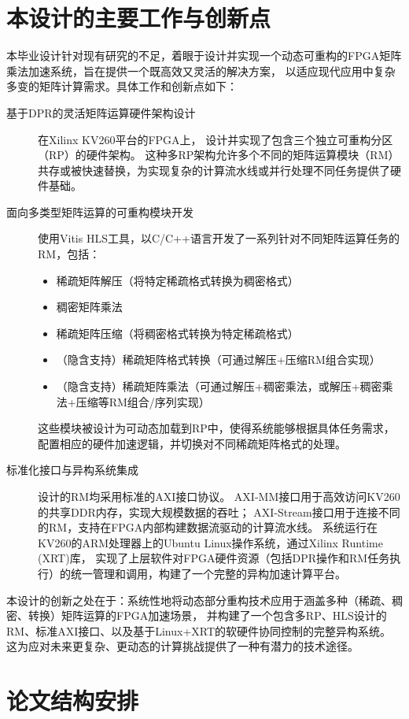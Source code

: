 \section{本设计的主要工作与创新点}

本毕业设计针对现有研究的不足，着眼于设计并实现一个动态可重构的FPGA矩阵乘法加速系统，旨在提供一个既高效又灵活的解决方案，
以适应现代应用中复杂多变的矩阵计算需求。具体工作和创新点如下：
\begin{description}
\item[基于DPR的灵活矩阵运算硬件架构设计] 在Xilinx KV260平台的FPGA上，
  设计并实现了包含三个独立可重构分区（RP）的硬件架构。
  这种多RP架构允许多个不同的矩阵运算模块（RM）共存或被快速替换，为实现复杂的计算流水线或并行处理不同任务提供了硬件基础。
\item[面向多类型矩阵运算的可重构模块开发] 使用Vitis HLS工具，以C/C++语言开发了一系列针对不同矩阵运算任务的RM，包括：
\begin{itemize}
  \item 稀疏矩阵解压（将特定稀疏格式转换为稠密格式）
  \item 稠密矩阵乘法
  \item 稀疏矩阵压缩（将稠密格式转换为特定稀疏格式）
  \item （隐含支持）稀疏矩阵格式转换（可通过解压+压缩RM组合实现）
  \item （隐含支持）稀疏矩阵乘法（可通过解压+稠密乘法，或解压+稠密乘法+压缩等RM组合/序列实现）
\end{itemize}
这些模块被设计为可动态加载到RP中，使得系统能够根据具体任务需求，配置相应的硬件加速逻辑，并切换对不同稀疏矩阵格式的处理。
\item[标准化接口与异构系统集成] 设计的RM均采用标准的AXI接口协议。
AXI-MM接口用于高效访问KV260的共享DDR内存，实现大规模数据的吞吐；
AXI-Stream接口用于连接不同的RM，支持在FPGA内部构建数据流驱动的计算流水线。
系统运行在KV260的ARM处理器上的Ubuntu Linux操作系统，通过Xilinx Runtime (XRT)库，
实现了上层软件对FPGA硬件资源（包括DPR操作和RM任务执行）的统一管理和调用，构建了一个完整的异构加速计算平台。
\end{description}

本设计的创新之处在于：系统性地将动态部分重构技术应用于涵盖多种（稀疏、稠密、转换）矩阵运算的FPGA加速场景，
并构建了一个包含多RP、HLS设计的RM、标准AXI接口、以及基于Linux+XRT的软硬件协同控制的完整异构系统。
这为应对未来更复杂、更动态的计算挑战提供了一种有潜力的技术途径。

\section{论文结构安排}

